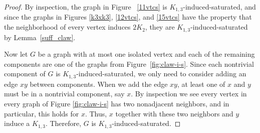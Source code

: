\documentclass[12pt]{amsart}
\theoremstyle{plain}
\theoremstyle{definition}
\theoremstyle{remark}
\newcommand{\claw}{\ensuremath{K_{1,3}}\xspace}
\begin{document}
\begin{proof}
By inspection, the graph in Figure ~\ref{11vtcs} is \claw-induced-saturated, and since the graphs in Figures \ref{k3xk3}, \ref{12vtcs}, and \ref{15vtcs} have the property that the neighborhood of every vertex induces $2K_2$, they are \claw-induced-saturated by Lemma~\ref{suff_claw}.

Now let $G$ be a graph with at most one isolated vertex and each of the remaining components are one of the graphs from Figure~\ref{fig:claw-i-s}.
Since each nontrivial component of $G$ is \claw-induced-saturated, we only need to consider adding an edge $xy$ between components.    When we add the edge $xy$, at least one of $x$ and $y$ must be in a nontrivial component, say $x$.  By inspection we see every vertex in every graph of Figure \ref{fig:claw-i-s} has two nonadjacent neighbors, and in particular, this holds for $x$.  Thus, $x$ together with these two neighbors  and $y$ induce a \claw.  Therefore, $G$ is \claw-induced-saturated.
\end{proof}
\end{document}
